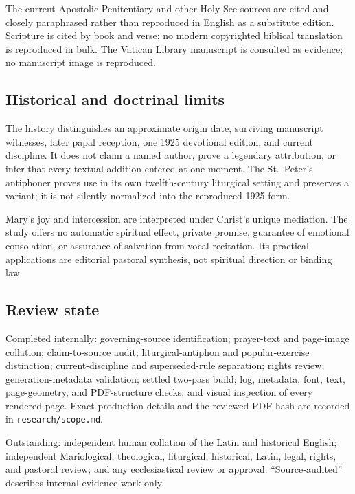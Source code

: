 The current Apostolic Penitentiary and other Holy See sources are cited and closely paraphrased rather than reproduced in English as a substitute edition. Scripture is cited by book and verse; no modern copyrighted biblical translation is reproduced in bulk. The Vatican Library manuscript is consulted as evidence; no manuscript image is reproduced.

\subsection{Historical and doctrinal limits}

The history distinguishes an approximate origin date, surviving manuscript witnesses, later papal reception, one 1925 devotional edition, and current discipline. It does not claim a named author, prove a legendary attribution, or infer that every textual addition entered at one moment. The St.~Peter's antiphoner proves use in its own twelfth-century liturgical setting and preserves a variant; it is not silently normalized into the reproduced 1925 form.

Mary's joy and intercession are interpreted under Christ's unique mediation. The study offers no automatic spiritual effect, private promise, guarantee of emotional consolation, or assurance of salvation from vocal recitation. Its practical applications are editorial pastoral synthesis, not spiritual direction or binding law.

\subsection{Review state}

Completed internally: governing-source identification; prayer-text and page-image collation; claim-to-source audit; liturgical-antiphon and popular-exercise distinction; current-discipline and superseded-rule separation; rights review; generation-metadata validation; settled two-pass build; log, metadata, font, text, page-geometry, and PDF-structure checks; and visual inspection of every rendered page. Exact production details and the reviewed PDF hash are recorded in \texttt{research/scope.md}.

Outstanding: independent human collation of the Latin and historical English; independent Mariological, theological, liturgical, historical, Latin, legal, rights, and pastoral review; and any ecclesiastical review or approval. ``Source-audited'' describes internal evidence work only.
